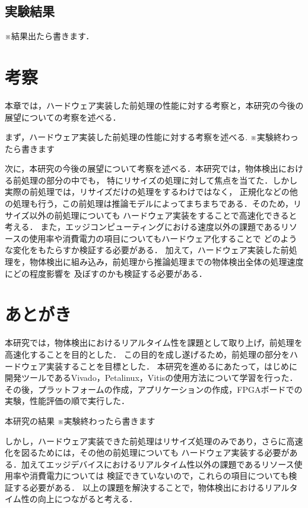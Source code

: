 \documentclass[11pt,a4j]{jreport}
\begin{document}
\section{実験結果}
※結果出たら書きます．
%
\chapter{考察}
本章では，ハードウェア実装した前処理の性能に対する考察と，本研究の今後の展望についての考察を述べる．

まず，ハードウェア実装した前処理の性能に対する考察を述べる.
※実験終わったら書きます

次に，本研究の今後の展望について考察を述べる．本研究では，物体検出における前処理の部分の中でも，
特にリサイズの処理に対して焦点を当てた．しかし実際の前処理では，リサイズだけの処理をするわけではなく，
正規化などの他の処理も行う，この前処理は推論モデルによってまちまちである．そのため，リサイズ以外の前処理についても
ハードウェア実装をすることで高速化できると考える．
また，エッジコンピューティングにおける速度以外の課題であるリソースの使用率や消費電力の項目についてもハードウェア化することで
どのような変化をもたらすか検証する必要がある．
加えて，ハードウェア実装した前処理を，物体検出に組み込み，前処理から推論処理までの物体検出全体の処理速度にどの程度影響を
及ぼすのかも検証する必要がある．
\chapter{あとがき}
本研究では，物体検出におけるリアルタイム性を課題として取り上げ，前処理を高速化することを目的とした．
この目的を成し遂げるため，前処理の部分をハードウェア実装することを目標とした．
本研究を進めるにあたって，はじめに開発ツールであるVivado，Petalinux，Vitisの使用方法について学習を行った．
その後，プラットフォームの作成，アプリケーションの作成，FPGAボードでの実験，性能評価の順で実行した．

本研究の結果
※実験終わったら書きます

しかし，ハードウェア実装できた前処理はリサイズ処理のみであり，さらに高速化を図るためには，その他の前処理についても
ハードウェア実装する必要がある．加えてエッジデバイスにおけるリアルタイム性以外の課題であるリソース使用率や消費電力については
検証できていないので，これらの項目についても検証する必要がある．
以上の課題を解決することで，物体検出におけるリアルタイム性の向上につながると考える．
\end{document}

